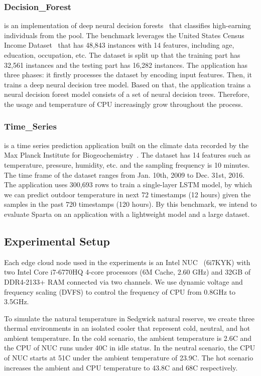 \subsubsection{Decision\_Forest} is an implementation of deep neural decision forests~\cite{ref:decision_forest} that classifies high-earning individuals from the pool. The benchmark leverages the United States Census Income Dataset~\cite{ref:uci} that has 48,843 instances with 14 features, including age, education, occupation, etc. The dataset is split up that the training part has 32,561 instances and the testing part has 16,282 instances. The application has three phases: it firstly processes the dataset by encoding input features. Then, it trains a deep neural decision tree model. Based on that, the application trains a neural decision forest model consists of a set of neural decision trees. Therefore, the usage and temperature of CPU increasingly grow throughout the process.


\subsubsection{Time\_Series} is a time series prediction application built on the climate data recorded by the Max Planck Institute for Biogeochemistry~\cite{ref:jena}. The dataset has 14 features such as temperature, pressure, humidity, etc. and the sampling frequency is 10 minutes. The time frame of the dataset ranges from Jan. 10th, 2009 to Dec. 31st, 2016. The application uses 300,693 rows to train a single-layer LSTM model, by which we can predict outdoor temperature in next 72 timestamps (12 hours) given the samples in the past 720 timestamps (120 hours). By this benchmark, we intend to evaluate Sparta on an application with a lightweight model and a large dataset.


\subsection{Experimental Setup}

Each edge cloud node used in the experiments is an Intel NUC~\cite{ref:nuc} (6i7KYK) with two Intel Core i7-6770HQ 4-core processors (6M Cache, 2.60 GHz) and 32GB of DDR4-2133+ RAM connected via two channels. We use dynamic voltage and frequency scaling (DVFS) to control the frequency of CPU from 0.8GHz to 3.5GHz.

To simulate the natural temperature in Sedgwick natural reserve, we create three thermal environments in an isolated cooler that represent cold, neutral, and hot ambient temperature. In the cold scenario, the ambient temperature is 2.6\degree C and the CPU of NUC runs under 40\degree C in idle status. In the neutral scenario, the CPU of NUC starts at 51\degree C under the ambient temperature of 23.9\degree C. The hot scenario increases the ambient and CPU temperature to 43.8\degree C and 68\degree C respectively.

